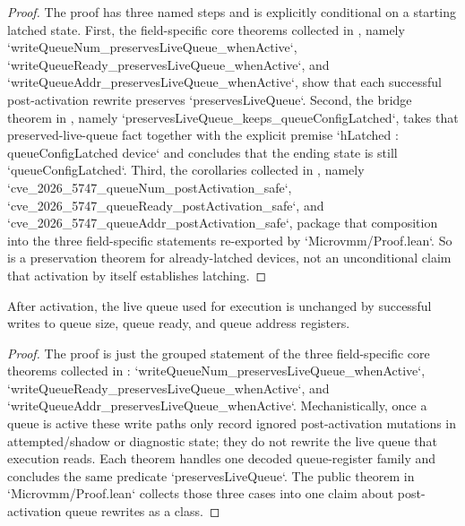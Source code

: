 \begin{proof}
\leanok
{}
The proof has three named steps and is explicitly conditional on a starting latched state.
First, the field-specific core theorems collected in , namely `writeQueueNum_preservesLiveQueue_whenActive`, `writeQueueReady_preservesLiveQueue_whenActive`, and `writeQueueAddr_preservesLiveQueue_whenActive`, show that each successful post-activation rewrite preserves `preservesLiveQueue`.
Second, the bridge theorem in , namely `preservesLiveQueue_keeps_queueConfigLatched`, takes that preserved-live-queue fact together with the explicit premise `hLatched : queueConfigLatched device` and concludes that the ending state is still `queueConfigLatched`.
Third, the corollaries collected in , namely `cve_2026_5747_queueNum_postActivation_safe`, `cve_2026_5747_queueReady_postActivation_safe`, and `cve_2026_5747_queueAddr_postActivation_safe`, package that composition into the three field-specific statements re-exported by `Microvmm/Proof.lean`.
So  is a preservation theorem for already-latched devices, not an unconditional claim that activation by itself establishes latching.
\end{proof}

\begin{theorem}
\label{thm:queue-immutability}
\leanok
After activation, the live queue used for execution is unchanged by successful writes to queue size, queue ready, and queue address registers.
\end{theorem}

\begin{proof}
\leanok
{}
The proof is just the grouped statement of the three field-specific core theorems collected in : `writeQueueNum_preservesLiveQueue_whenActive`, `writeQueueReady_preservesLiveQueue_whenActive`, and `writeQueueAddr_preservesLiveQueue_whenActive`.
Mechanistically, once a queue is active these write paths only record ignored post-activation mutations in attempted/shadow or diagnostic state; they do not rewrite the live queue that execution reads.
Each theorem handles one decoded queue-register family and concludes the same predicate `preservesLiveQueue`.
The public theorem in `Microvmm/Proof.lean` collects those three cases into one claim about post-activation queue rewrites as a class.
\end{proof}

